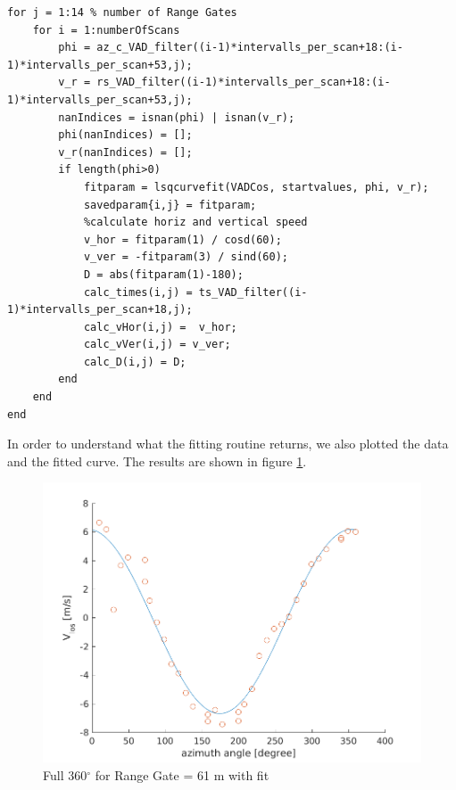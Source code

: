 \documentclass[10pt]{article}
\begin{document}
\begin{lstlisting}
for j = 1:14 % number of Range Gates
    for i = 1:numberOfScans
        phi = az_c_VAD_filter((i-1)*intervalls_per_scan+18:(i-1)*intervalls_per_scan+53,j);
        v_r = rs_VAD_filter((i-1)*intervalls_per_scan+18:(i-1)*intervalls_per_scan+53,j);
        nanIndices = isnan(phi) | isnan(v_r); 
        phi(nanIndices) = [];
        v_r(nanIndices) = [];
        if length(phi>0)
            fitparam = lsqcurvefit(VADCos, startvalues, phi, v_r);
            savedparam{i,j} = fitparam;
            %calculate horiz and vertical speed
            v_hor = fitparam(1) / cosd(60);
            v_ver = -fitparam(3) / sind(60);
            D = abs(fitparam(1)-180);
            calc_times(i,j) = ts_VAD_filter((i-1)*intervalls_per_scan+18,j);
            calc_vHor(i,j) =  v_hor;
            calc_vVer(i,j) = v_ver;
            calc_D(i,j) = D;
        end
    end 
end
\end{lstlisting}

In order to understand what the fitting routine returns, we also plotted the data and the fitted curve. The results are shown in figure \ref{fig:fit}.

\begin{figure}[H]
\includegraphics[width=1\linewidth]{../Exercises_and_Tasks/ex2/figures/fit.png}
\caption{Full 360$^\circ$ for Range Gate = 61 m with fit}
\label{fig:fit}
\end{figure}
\end{document}
